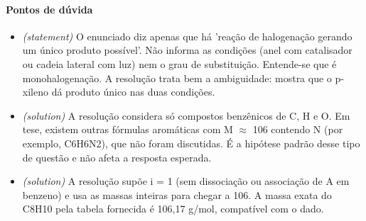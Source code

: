 \documentclass{article}%
\begin{document}
\paragraph{Pontos de dúvida}%
\begin{itemize}%
\item%
\textit{(statement)} O enunciado diz apenas que há 'reação de halogenação gerando um único produto possível'. Não informa as condições (anel com catalisador ou cadeia lateral com luz) nem o grau de substituição. Entende{-}se que é monohalogenação. A resolução trata bem a ambiguidade: mostra que o p{-}xileno dá produto único nas duas condições.%
\item%
\textit{(solution)} A resolução considera só compostos benzênicos de C, H e O. Em tese, existem outras fórmulas aromáticas com M $\approx$ 106 contendo N (por exemplo, C6H6N2), que não foram discutidas. É a hipótese padrão desse tipo de questão e não afeta a resposta esperada.%
\item%
\textit{(solution)} A resolução supõe i = 1 (sem dissociação ou associação de A em benzeno) e usa as massas inteiras para chegar a 106. A massa exata do C8H10 pela tabela fornecida é 106,17 g/mol, compatível com o dado.%
\end{itemize}%
\end{document}
